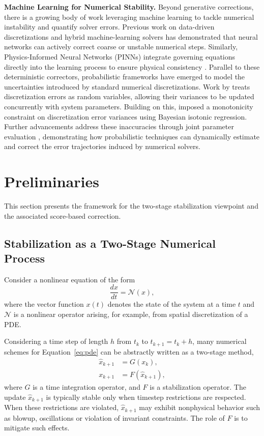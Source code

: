 \documentclass[letterpaper]{article} %
\def\Eqref#1{Equation~\ref{#1}}
\providecommand{\Eqref}[1]{\Cref{#1}}
\begin{document}
\textbf{Machine Learning for Numerical Stability.} 
Beyond generative corrections, there is a growing body of work leveraging machine learning to tackle numerical instability and quantify solver errors. Previous work on data-driven discretizations \citep{bar2019learning} and hybrid machine-learning solvers \citep{kochkov2021machine} has demonstrated that neural networks can actively correct coarse or unstable numerical steps. Similarly, Physics-Informed Neural Networks (PINNs) integrate governing equations directly into the learning process to ensure physical consistency \citep{raissi2019physics}. Parallel to these deterministic correctors, probabilistic frameworks have emerged to model the uncertainties introduced by standard numerical discretizations. Work by \citet{matsuda2021estimation} treats discretization errors as random variables, allowing their variances to be updated concurrently with system parameters. Building on this, \citet{miyatake2025quantifying} imposed a monotonicity constraint on discretization error variances using Bayesian isotonic regression. Further advancements address these inaccuracies through joint parameter evaluation \citep{toyota2025joint}, demonstrating how probabilistic techniques can dynamically estimate and correct the error trajectories induced by numerical solvers.





\section{Preliminaries}

This section presents the framework for the two-stage stabilization viewpoint and the associated score-based correction.

\subsection{Stabilization as a Two-Stage Numerical Process}

Consider a nonlinear equation of the form
\begin{equation}
\label{eq:pde}
\frac{d x}{d t} = \mathcal{N}(x),
\end{equation}
where the vector function $x(t)$ denotes the state of the system at a time $t$ and $\mathcal{N}$ is a nonlinear operator arising, for example, from spatial discretization of a PDE.

Considering a time step of length $h$ from $t_k$ to $t_{k+1} = t_k + h$, many numerical schemes for \Eqref{eq:pde} can be abstractly written as a two-stage method,
\begin{align}
\label{eq:two_step}
\hat{x}_{k+1} &= G(x_k), \\
x_{k+1} &= F(\hat{x}_{k+1}),
\end{align}
where $G$ is a time integration operator, and $F$ is a stabilization operator.
The update $\hat{x}_{k+1}$ is typically stable only when timestep restrictions are respected. When these restrictions are violated, $\hat{x}_{k+1}$ may exhibit nonphysical behavior such as blowup, oscillations or violation of invariant constraints. The role of $F$ is to mitigate such effects.
\end{document}
